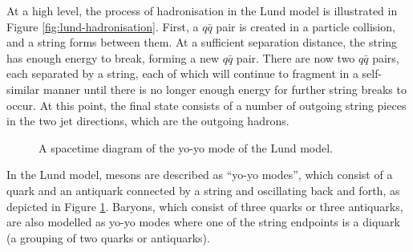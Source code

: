 \documentclass[12pt,a4paper]{report}
\begin{document}
At a high level, the process of hadronisation in the Lund model is illustrated in Figure \ref{fig:lund-hadronisation}. First, a $q\bar{q}$ pair is created in a particle collision, and a string forms between them. At a sufficient separation distance, the string has enough energy to break, forming a new $q\bar{q}$ pair. There are now two $q\bar{q}$ pairs, each separated by a string, each of which will continue to fragment in a self-similar manner until there is no longer enough energy for further string breaks to occur. At this point, the final state consists of a number of outgoing string pieces in the two jet directions, which are the outgoing hadrons.

\begin{figure}
  \centering
  \label{fig:yoyo-mode}
  \caption{A spacetime diagram of the yo-yo mode of the Lund model.}
\end{figure}

In the Lund model, mesons are described as ``yo-yo modes'', which consist of a quark and an antiquark connected by a string and oscillating back and forth, as depicted in Figure \ref{fig:yoyo-mode}. Baryons, which consist of three quarks or three antiquarks, are also modelled as yo-yo modes where one of the string endpoints is a diquark (a grouping of two quarks or antiquarks).
\end{document}

